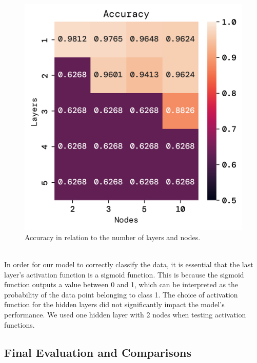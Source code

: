 \documentclass[twoside,11pt]{report}
\begin{document}
\begin{figure}[!ht]
\begin{minipage}[t]{0.5\textwidth - 1mm}
\begin{center}
                \includegraphics[width=\textwidth]{../runsAndFigures/accuracy_layers_nodes.png}
            \end{center}
            \caption
            {
                Accuracy in relation to the number of layers and nodes.
            }\label{fig:accuracy_layers_nodes}
        \end{minipage}
    \end{figure}


    \noindent
    \\
    In order for our model to correctly classify the data, it is essential that the last layer's activation function
    is a sigmoid function. This is because the sigmoid function outputs a value between 0 and 1, which can be
    interpreted as the probability of the data point belonging to class 1. The choice of activation function for the
    hidden layers did not significantly impact the model's performance.
    We used one hidden layer with 2 nodes when testing activation functions.

\newpage
\subsection{Final Evaluation and Comparisons}
\label{sec:comparisons}
\end{document}
